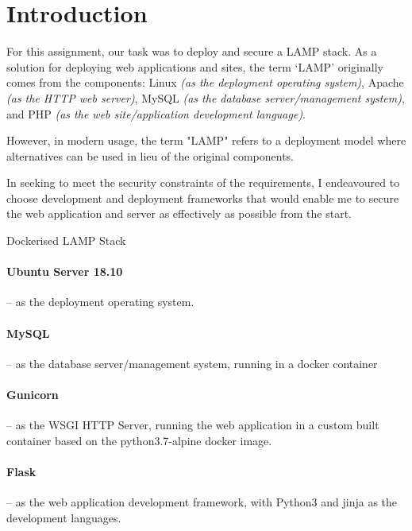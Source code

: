 \section{Introduction}

For this assignment, our task was to deploy and secure a LAMP stack. As a solution for deploying web applications and sites, the term `LAMP' originally comes from the components: Linux \textit{(as the deployment operating system)}, Apache \textit{(as the HTTP web server)}, MySQL \textit{(as the database server/management system)}, and PHP \textit{(as the web site/application development language)}.

However, in modern usage, the term "LAMP" refers to a deployment model where alternatives can be used in lieu of the original components.

In seeking to meet the security constraints of the requirements, I endeavoured to choose development and deployment frameworks that would enable me to secure the web application and server as effectively as possible from the start.


\begin{displaytable}{\label{display:lamp_stack}}{Dockerised LAMP Stack}
  \paragraph{\href{http://releases.ubuntu.com/18.10/ubuntu-18.10-live-server-amd64.iso}{\faExternalLinkSquare} Ubuntu Server 18.10}
  \hspace{-0.6em}-- as the deployment operating system.
  \paragraph{\href{https://hub.docker.com/\_/mysql}{\faExternalLinkSquare} MySQL}
  \hspace{-0.6em}-- as the database server/management system, running in a docker container 
  \paragraph{\href{https://pypi.org/project/gunicorn/}{\faExternalLinkSquare} Gunicorn}
  \hspace{-0.6em}-- as the WSGI HTTP Server, running the web application in a custom built container based on the python3.7-alpine docker image.
  \paragraph{\href{https://pypi.org/project/Flask/1.0.2/}{\faExternalLinkSquare} Flask}
  \hspace{-0.6em}-- as the web application development framework, with Python3 and jinja as the development languages.
  \vspace{1em}
\end{displaytable}
